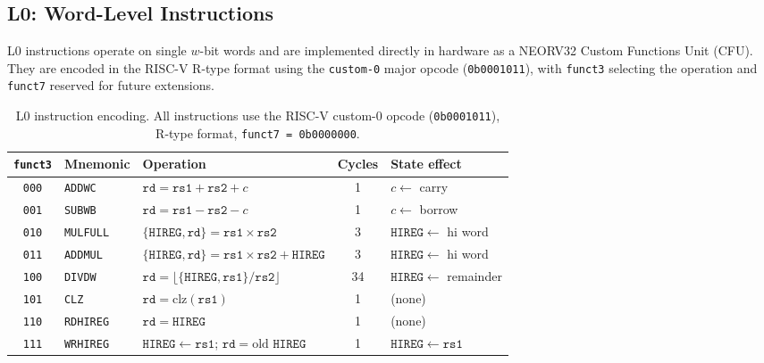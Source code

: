 \documentclass[11pt,a4paper]{article}
\begin{document}
\subsection{L0: Word-Level Instructions}
\label{sec:l0}

L0 instructions operate on single $w$-bit words and are implemented directly
in hardware as a NEORV32 Custom Functions Unit (CFU).  They are encoded in the
RISC-V R-type format using the \texttt{custom-0} major opcode
(\texttt{0b0001011}), with \texttt{funct3} selecting the operation and
\texttt{funct7} reserved for future extensions.

\begin{table}[t]
\centering
\caption{L0 instruction encoding.  All instructions use the RISC-V custom-0
  opcode (\texttt{0b0001011}), R-type format, \texttt{funct7 = 0b0000000}.}
\label{tab:l0-encoding}
\begin{tabular}{@{}cllcl@{}}
\toprule
\texttt{funct3} & Mnemonic & Operation & Cycles & State effect \\
\midrule
\texttt{000} & \texttt{ADDWC}   & $\mathtt{rd} = \mathtt{rs1} + \mathtt{rs2} + c$ & 1 & $c \leftarrow$ carry \\
\texttt{001} & \texttt{SUBWB}   & $\mathtt{rd} = \mathtt{rs1} - \mathtt{rs2} - c$ & 1 & $c \leftarrow$ borrow \\
\texttt{010} & \texttt{MULFULL} & $\{\mathtt{HIREG},\mathtt{rd}\} = \mathtt{rs1} \times \mathtt{rs2}$ & 3 & $\mathtt{HIREG} \leftarrow$ hi word \\
\texttt{011} & \texttt{ADDMUL}  & $\{\mathtt{HIREG},\mathtt{rd}\} = \mathtt{rs1} \times \mathtt{rs2} + \mathtt{HIREG}$ & 3 & $\mathtt{HIREG} \leftarrow$ hi word \\
\texttt{100} & \texttt{DIVDW}   & $\mathtt{rd} = \lfloor\{\mathtt{HIREG},\mathtt{rs1}\}/\mathtt{rs2}\rfloor$ & 34 & $\mathtt{HIREG} \leftarrow$ remainder \\
\texttt{101} & \texttt{CLZ}     & $\mathtt{rd} = \mathrm{clz}(\mathtt{rs1})$ & 1 & (none) \\
\texttt{110} & \texttt{RDHIREG} & $\mathtt{rd} = \mathtt{HIREG}$ & 1 & (none) \\
\texttt{111} & \texttt{WRHIREG} & $\mathtt{HIREG} \leftarrow \mathtt{rs1}$; $\mathtt{rd} = \text{old } \mathtt{HIREG}$ & 1 & $\mathtt{HIREG} \leftarrow \mathtt{rs1}$ \\
\bottomrule
\end{tabular}
\end{table}
\end{document}
